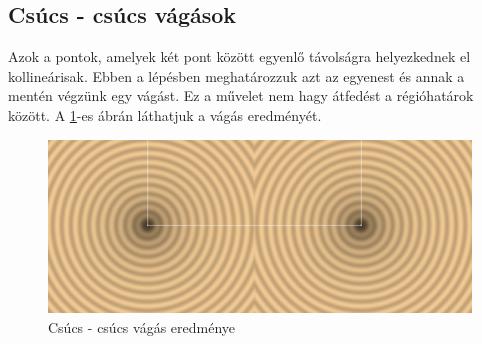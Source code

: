 \subsection{Csúcs - csúcs vágások}

Azok a pontok, amelyek két pont között egyenlő távolságra helyezkednek el kollineárisak. Ebben a lépésben meghatározzuk azt az egyenest és annak a mentén végzünk egy vágást. Ez a művelet nem hagy átfedést a régióhatárok között. A \ref{fig:vertex_vertex_cut-1}-es ábrán láthatjuk a vágás eredményét.

\begin{figure}[H]
    \centering
    \includegraphics[width=1\linewidth]{images/vertex_vertex_cut.png}
    \caption{Csúcs - csúcs vágás eredménye}
    \label{fig:vertex_vertex_cut-1}
\end{figure}

